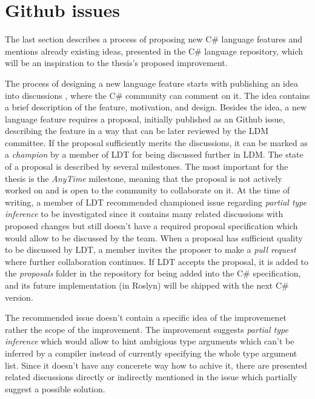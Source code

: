 \section{Github issues} \label{sect04:github}

The last section describes a process of proposing new C\# language features and mentions already existing ideas, presented in the C\# language repository, which will be an inspiration to the thesis's proposed improvement.
\par
The process of designing a new language feature starts with publishing an idea into discussions \cite{online:discussions}, where the C\# community can comment on it. 
The idea contains a brief description of the feature, motivation, and design. 
Besides the idea, a new language feature requires a proposal, initially published as an Github issue, describing the feature in a way that can be later reviewed by the \ac{LDM} committee.
If the proposal sufficiently merits the discussions, it can be marked as a \textit{champion} by a member of \ac{LDT} for being discussed further in \ac{LDM}. 
The state of a proposal is described by several milestones. 
The most important for the thesis is the \textit{AnyTime} milestone, meaning that the proposal is not actively worked on and is open to the community to collaborate on it. 
At the time of writing, a member of \ac{LDT} recommended championed issue \cite{online:champion} regarding \textit{partial type inference} to be investigated since it contains many related discussions with proposed changes but still doesn’t have a required proposal specification which would allow to be discussed by the team. 
When a proposal has sufficient quality to be discussed by \ac{LDT}, a member invites the proposer to make a \textit{pull request} where further collaboration continues. 
If \ac{LDT} accepts the proposal, it is added to the \textit{proposals} folder in the repository for being added into the C\# specification, and its future implementation (in Roslyn) will be shipped with the next C\# version. 
\par
The recommended issue doesn't contain a specific idea of the improvemenet rather the scope of the improvement.
The improvement suggests \textit{partial type inference} which would allow to hint ambigious type arguments which can't be inferred by a compiler instead of currently specifying the whole type argument list.
Since it doesn't have any concerete way how to achive it, there are presented related discussions directly or indirectly mentioned in the issue which partially suggest a possible solution.

